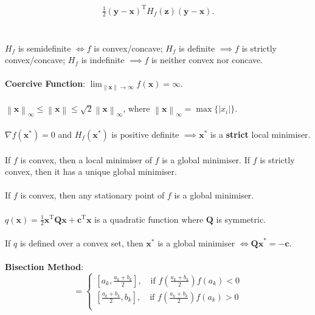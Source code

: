 \documentclass[12pt]{article}
\begin{document}
\begin{multicols}{3}
\begin{multline*}
            \frac{1}{2}(\bm{y - x})^{\mathrm{T}}H_f(\bm{z})(\bm{y - x}).
        \end{multline*}
        \\\\
        $H_f$ is semidefinite $\iff f$ is convex/concave; $H_f$ is definite $\implies f$ is strictly convex/concave; $H_f$ is indefinite $\implies f$ is neither convex nor concave.
        \\\\
        \textbf{Coercive Function}: $\lim_{\left\lVert\bm{x}\right\rVert \to \infty}f(\bm{x}) = \infty$.
        \\\\
        $\left\lVert\bm{x}\right\rVert_\infty \leq \left\lVert\bm{x}\right\rVert \leq \sqrt{2}\left\lVert\bm{x}\right\rVert_\infty$, where $\left\lVert\bm{x}\right\rVert_\infty = \max\{\left\lvert x_i \right\rvert\}$.
        \\\\
        $\nabla f(\bm{x}^*) = 0$ and $H_f(\bm{x}^*)$ is positive definite $\implies \bm{x}^*$ is a \textbf{strict} local minimiser.
        \\\\
        If $f$ is convex, then a local minimiser of $f$ is a global minimiser. If $f$ is strictly convex, then it has a unique global minimiser.
        \\\\
        If $f$ is convex, then any stationary point of $f$ is a global minimiser.
        \\\\
        $q(\bm{x}) = \frac{1}{2}\bm{x}^{\mathrm{T}}\bm{Qx} + \bm{c}^{\mathrm{T}}\bm{x}$ is a quadratic function where $\bm{Q}$ is symmetric.
        \\\\
        If $q$ is defined over a convex set, then $\bm{x}^*$ is a global minimiser $\iff \bm{Qx}^* = -\bm{c}$.
        \\\\
        \textbf{Bisection Method}: 
        \begin{equation*}
            [a_{k + 1}, b_{k + 1}] = \begin{cases}
                \left[a_k, 
                \frac{a_k + b_k}{2}\right], \quad \textrm{if } f\left(\frac{a_k + b_k}{2}\right)f(a_k) < 0 \\
                \left[\frac{a_k + b_k}{2}, b_k\right], \quad \textrm{if } f\left(\frac{a_k + b_k}{2}\right)f(a_k) > 0 \\

\end{cases}
\end{equation*}
\end{multicols}
\end{document}

